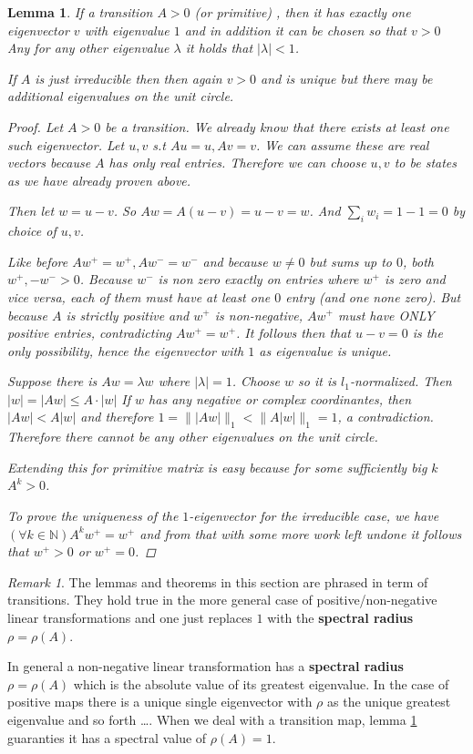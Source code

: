 \documentclass[a4paper,10pt]{article}
\newcommand{\N}{\mathbb{N}}
\newcommand{\gt}{>}
\newcommand{\lt}{<}
\theoremstyle{definition}
\theoremstyle{remark}
\newtheorem{remark}{Remark}
\theoremstyle{plain}
\newtheorem{lemma}{Lemma}[section]
\begin{document}
\begin{lemma}
\label{lem:uniq1}
If a transition $A \gt 0$ (or primitive)
, then it has exactly
one eigenvector $v$ with eigenvalue $1$ and in addition it can be chosen so that $v > 0$
Any for any other eigenvalue
$\lambda$ it holds that $|\lambda| \lt 1$.

If $A$ is just irreducible then then again $v>0$ and is unique but there may be
additional eigenvalues on the unit circle.

\begin{proof}
Let $A \gt 0$ be a transition. We already know that there exists at least one such eigenvector.
Let $u,v$ s.t $Au=u, Av=v$. 
We can assume these are real vectors because $A$ has only real entries.
Therefore we can choose $u,v$
to be states as we have already proven above.

Then let $w=u-v$. So $Aw = A(u-v) = u-v = w$. 
And $\sum_i w_i = 1 - 1 = 0$ by choice of $u,v$.

Like before $Aw^+ = w^+, Aw^- = w^-$
and because $w \neq 0$ but sums up to $0$, both $w^+, -w^- > 0$.
Because $w^-$ is non zero exactly on entries where $w^+$ is zero and vice versa, 
each of them must have at least one $0$ entry (and one none zero). But because
$A$ is strictly positive and $w^+$ is non-negative, $Aw^+$ must have ONLY
positive entries, contradicting $Aw^+ = w^+$. It follows then that $u-v=0$ is
the only possibility, hence the eigenvector with $1$ as eigenvalue is unique.

Suppose there is $Aw = \lambda w$ where $| \lambda|=1$. Choose $w$ so it is
$l_1$-normalized. Then $|w| = |Aw| \leq A \cdot |w|$ If $w$ has any negative or
complex coordinantes, then $|Aw| \lt A|w|$ and therefore 
$1 = \| |Aw| \|_1 \lt \|A|w|\|_1 =1$, a contradiction. Therefore there cannot be
any other eigenvalues on the unit circle.

Extending this for primitive matrix is easy because for some sufficiently big
$k$ $A^k \gt 0$. 

To prove the uniqueness of the $1$-eigenvector for the irreducible case, we have
$(\forall k \in \N) A^kw^+ = w^+$ and from that with some more work left undone
it follows that $w^+ > 0$ or
$w^+ = 0$.
\qedsymbol

\end{proof}
\end{lemma}

\begin{remark}
\label{remark:rhoisone}
The lemmas and theorems in this section are phrased in term of transitions. They
hold true in the more general case of positive/non-negative
linear transformations and one just replaces $1$ with the \textbf{spectral
radius} $ \rho = \rho(A)$.

In general a non-negative linear transformation has a \textbf{spectral radius}
$\rho = \rho(A)$ which is the absolute value of its greatest eigenvalue. In the case of
positive maps there is a unique single eigenvector with $\rho$ as the unique
greatest eigenvalue and so forth \dots. When we deal with a transition map,
lemma \ref{lem:uniq1} guaranties 
it has a spectral value of $\rho(A) = 1$.
\end{remark}
\end{document}
